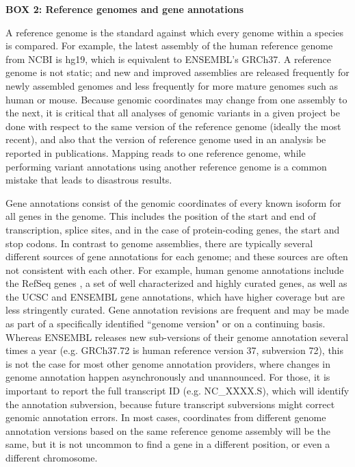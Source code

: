 \textbf{BOX 2: Reference genomes and gene annotations}
\begin{framed}
A reference genome is the standard against which every genome within a species is compared. For example, the latest assembly of the human reference genome from NCBI is hg19, which is equivalent to ENSEMBL’s GRCh37. A reference genome is not static; and new and improved assemblies are released frequently for newly assembled genomes and less frequently for more mature genomes such as human or mouse. Because genomic coordinates may change from one assembly to the next, it is critical that all analyses of genomic variants in a given project be done with respect to the same version of the reference genome (ideally the most recent), and also that the version of reference genome used in an analysis be reported in publications. Mapping reads to one reference genome, while performing variant annotations using another reference genome is a common mistake that leads to disastrous results.

Gene annotations consist of the genomic coordinates of every known isoform for all genes in the genome. This includes the position of the start and end of transcription, splice sites, and in the case of protein-coding genes, the start and stop codons. In contrast to genome assemblies, there are typically several different sources of gene annotations for each genome; and these sources are often not consistent with each other. For example, human genome annotations include the RefSeq genes  \cite{pruitt2007ncbi}, a set of well characterized and highly curated genes, as well as the UCSC  \cite{hsu2006ucsc} and ENSEMBL  \cite{curwen2004ensembl} gene annotations, which have higher coverage but are less stringently curated. Gene annotation revisions are frequent and may be made as part of a specifically identified ``genome version" or on a continuing basis. Whereas ENSEMBL releases new sub-versions of their genome annotation several times a year (e.g. GRCh37.72 is human reference version 37, subversion 72), this is not the case for most other genome annotation providers, where changes in genome annotation happen asynchronously and unannounced. For those, it is important to report the full transcript ID (e.g. NC\_XXXX.S), which will identify the annotation subversion, because future transcript subversions might correct genomic annotation errors. In most cases, coordinates from different genome annotation versions based on the same reference genome assembly will be the same, but it is not uncommon to find a gene in a different position, or even a different chromosome.


\end{framed}
